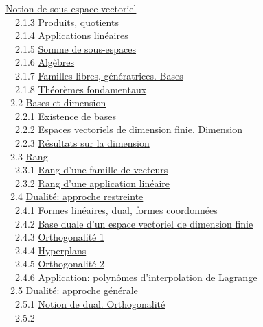 \documentclass[]{article}
\begin{document}
\href{coursse7.html\#x12-540002.1.2}{Notion de sous-espace vectoriel} \\
~~2.1.3 \href{coursse7.html\#x12-550002.1.3}{Produits, quotients} \\
~~2.1.4 \href{coursse7.html\#x12-560002.1.4}{Applications linéaires} \\
~~2.1.5 \href{coursse7.html\#x12-570002.1.5}{Somme de sous-espaces} \\
~~2.1.6 \href{coursse7.html\#x12-580002.1.6}{Algèbres} \\ ~~2.1.7
\href{coursse7.html\#x12-590002.1.7}{Familles libres, génératrices.
Bases} \\ ~~2.1.8 \href{coursse7.html\#x12-600002.1.8}{Théorèmes
fondamentaux} \\ ~2.2 \href{coursse8.html\#x13-610002.2}{Bases et
dimension} \\ ~~2.2.1 \href{coursse8.html\#x13-620002.2.1}{Existence de
bases} \\ ~~2.2.2 \href{coursse8.html\#x13-630002.2.2}{Espaces
vectoriels de dimension finie. Dimension} \\ ~~2.2.3
\href{coursse8.html\#x13-640002.2.3}{Résultats sur la dimension} \\ ~2.3
\href{coursse9.html\#x14-650002.3}{Rang} \\ ~~2.3.1
\href{coursse9.html\#x14-660002.3.1}{Rang d'une famille de vecteurs} \\
~~2.3.2 \href{coursse9.html\#x14-670002.3.2}{Rang d'une application
linéaire} \\ ~2.4 \href{coursse10.html\#x15-680002.4}{Dualité: approche
restreinte} \\ ~~2.4.1 \href{coursse10.html\#x15-690002.4.1}{Formes
linéaires, dual, formes coordonnées} \\ ~~2.4.2
\href{coursse10.html\#x15-700002.4.2}{Base duale d'un espace vectoriel
de dimension finie} \\ ~~2.4.3
\href{coursse10.html\#x15-710002.4.3}{Orthogonalité 1} \\ ~~2.4.4
\href{coursse10.html\#x15-720002.4.4}{Hyperplans} \\ ~~2.4.5
\href{coursse10.html\#x15-730002.4.5}{Orthogonalité 2} \\ ~~2.4.6
\href{coursse10.html\#x15-740002.4.6}{Application: polynômes
d'interpolation de Lagrange} \\ ~2.5
\href{coursse11.html\#x16-750002.5}{Dualité: approche générale} \\
~~2.5.1 \href{coursse11.html\#x16-760002.5.1}{Notion de dual.
Orthogonalité} \\ ~~2.5.2
\end{document}
